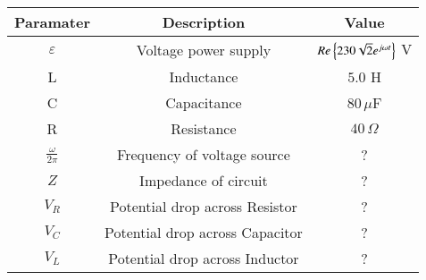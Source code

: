 \begin{tabular}{|c|c|c|}
\hline
\textbf{Paramater} & \textbf{Description} & \textbf{Value}  \\ \hline
$\varepsilon$ & Voltage power supply & $Re\left\{230\sqrt{2}e^{j\omega t}\right\}$ V  \\ \hline
L & Inductance & $5.0$ H  \\ \hline
C & Capacitance & $80\,\mu$F \\ \hline
R & Resistance & $40\,\Omega$ \\ \hline
$\frac{\omega}{2\pi}$ & Frequency of voltage source & ? \\ \hline 
$Z$ & Impedance of circuit & ? \\ \hline
$V_R$ & Potential drop across Resistor & ?\\ \hline
$V_C$ & Potential drop across Capacitor & ?\\ \hline
$V_L$ & Potential drop across Inductor & ?\\ \hline
\end{tabular}
